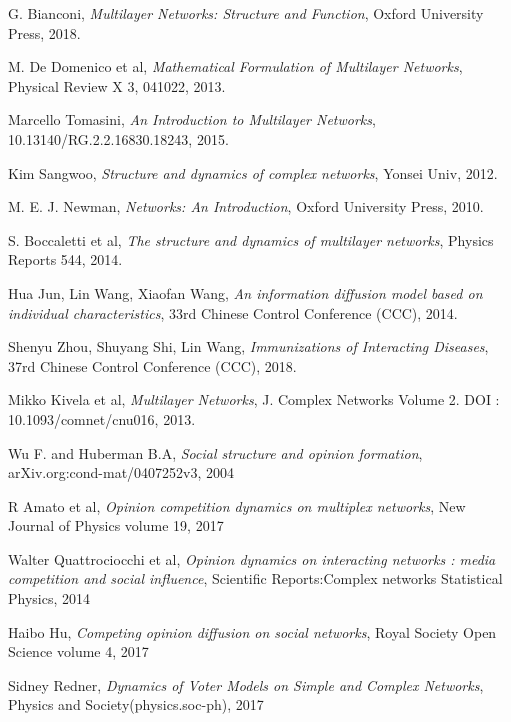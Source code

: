\documentclass[english]{cccconf}
\begin{document}
\begin{thebibliography}{0}
G. Bianconi, \textit{Multilayer Networks: Structure and Function}, Oxford University Press, 2018.

M. De Domenico et al, \textit{Mathematical Formulation of Multilayer Networks}, Physical Review X 3, 041022, 2013.

Marcello Tomasini, \textit{An Introduction to Multilayer Networks}, 10.13140/RG.2.2.16830.18243, 2015.

Kim Sangwoo, \textit{Structure and dynamics of complex networks}, Yonsei Univ, 2012.

M. E. J. Newman, \textit{Networks: An Introduction}, Oxford University Press, 2010.
	
S. Boccaletti et al, \textit{The structure and dynamics of multilayer networks}, Physics Reports 544, 2014.	

Hua Jun, Lin Wang, Xiaofan Wang, \textit{An information diffusion model based on individual characteristics}, 33rd Chinese Control Conference (CCC), 2014.

Shenyu Zhou,  Shuyang Shi, Lin Wang, \textit{Immunizations of Interacting Diseases}, 37rd Chinese Control Conference (CCC), 2018.
	
Mikko Kivela et al, \textit{Multilayer Networks}, J. Complex Networks Volume 2. DOI : 10.1093/comnet/cnu016, 2013.	
	
Wu F. and Huberman B.A, \textit{Social structure and opinion formation}, arXiv.org:cond-mat/0407252v3, 2004	


	
	
	
	
	
R Amato et al, \textit{Opinion competition dynamics on multiplex networks}, New Journal of Physics volume 19, 2017

Walter Quattrociocchi et al, \textit{Opinion dynamics on interacting networks : media competition and social influence}, Scientific Reports:Complex networks Statistical Physics, 2014

Haibo Hu, \textit{Competing opinion diffusion on social networks}, Royal Society Open Science volume 4, 2017




Sidney Redner, \textit{Dynamics of Voter Models on Simple and Complex Networks}, Physics and Society(physics.soc-ph), 2017






\end{thebibliography}
\end{document}
